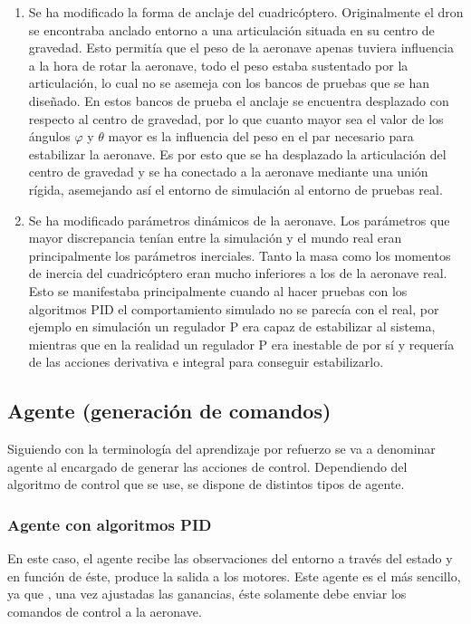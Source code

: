 \begin{enumerate}
	\item Se ha modificado la forma de anclaje del cuadricóptero. Originalmente el dron se encontraba anclado entorno a una articulación situada en su centro de gravedad. Esto permitía que el peso de la aeronave apenas tuviera influencia a la hora de rotar la aeronave, todo el peso estaba sustentado por la articulación, lo cual no se asemeja con los bancos de pruebas que se han diseñado. En estos bancos de prueba el anclaje se encuentra desplazado con respecto al centro de gravedad, por lo que cuanto mayor sea el valor de los ángulos $\varphi$ y $\theta$ mayor es la influencia del peso en el par necesario para estabilizar la aeronave. Es por esto que se ha desplazado la articulación del centro de gravedad y se ha conectado a la aeronave mediante una unión rígida, asemejando así el entorno de simulación al entorno de pruebas real.
	\item Se ha modificado parámetros dinámicos de la aeronave. Los parámetros que mayor discrepancia tenían entre la simulación y el mundo real eran principalmente los parámetros inerciales. Tanto la masa como los momentos de inercia del cuadricóptero eran mucho inferiores a los de la aeronave real. Esto se manifestaba principalmente cuando al hacer pruebas con los algoritmos PID el comportamiento simulado no se parecía con el real, por ejemplo en simulación un regulador P era capaz de estabilizar al sistema, mientras que en la realidad un regulador P era inestable de por sí y requería de las acciones derivativa e integral para conseguir estabilizarlo.
\end{enumerate}



 \subsection{Agente (generación de comandos)}
 
 Siguiendo con la terminología del aprendizaje por refuerzo se va a denominar agente al encargado de generar las acciones de control. Dependiendo del algoritmo de control que se use, se dispone de distintos tipos de agente.
 
 \subsubsection{Agente con algoritmos PID}
 En este caso, el agente recibe las observaciones del entorno a través del estado y en función de éste, produce la salida a los motores. Este agente es el más sencillo, ya que , una vez ajustadas las ganancias, éste solamente debe enviar los comandos de control a la aeronave.
 
